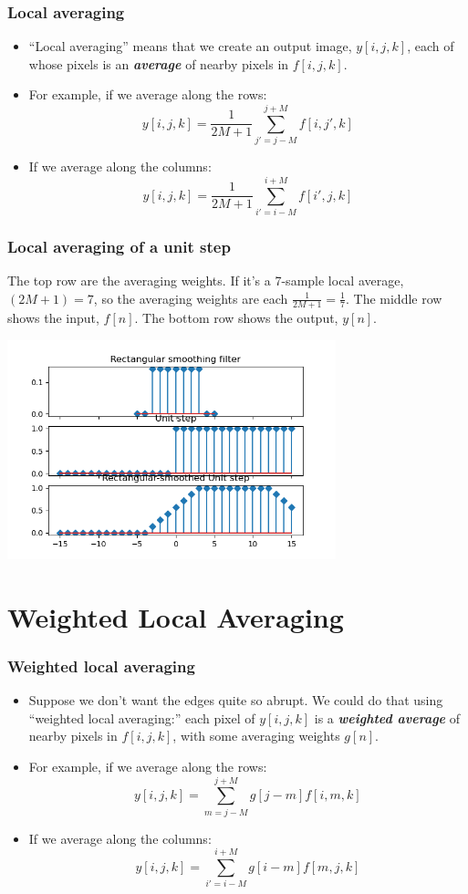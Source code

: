 \documentclass{beamer}
\begin{document}
\begin{frame}
  \frametitle{Local averaging}

  \begin{itemize}
    \item 
      ``Local averaging'' means that we create an output image,
      $y[i,j,k]$, each of whose pixels is an {\bf\em average} of nearby
      pixels in $f[i,j,k]$.
    \item
      For example, if we average along the rows:
      \[
      y[i,j,k] = \frac{1}{2M+1}\sum_{j'=j-M}^{j+M} f[i,j',k]
      \]
    \item
      If we average along the columns:
      \[
      y[i,j,k] = \frac{1}{2M+1}\sum_{i'=i-M}^{i+M} f[i',j,k]
      \]
  \end{itemize}
\end{frame}

\begin{frame}
  \frametitle{Local averaging of a unit step}
  The top row are the
  averaging weights.  If it's a 7-sample local average, $(2M+1)=7$, so
  the averaging weights are each $\frac{1}{2M+1}=\frac{1}{7}$.  The
  middle row shows the input, $f[n]$.  The bottom row shows the
  output, $y[n]$.
  \centerline{\includegraphics[height=2.5in]{mp1fig2.png}}
\end{frame}

\section[Weighted]{Weighted Local Averaging}
\setcounter{subsection}{1}

\begin{frame}
  \frametitle{Weighted local averaging}

  \begin{itemize}
    \item 
      Suppose we don't want the edges quite so abrupt.  We could do
      that using ``weighted local averaging:'' each pixel of
      $y[i,j,k]$ is a {\bf\em weighted average} of nearby pixels in
      $f[i,j,k]$, with some averaging weights $g[n]$.
    \item
      For example, if we average along the rows:
      \[
      y[i,j,k] = \sum_{m=j-M}^{j+M} g[j-m] f[i,m,k]
      \]
    \item
      If we average along the columns:
      \[
      y[i,j,k] = \sum_{i'=i-M}^{i+M} g[i-m] f[m,j,k]
      \]
  \end{itemize}
\end{frame}
\end{document}
